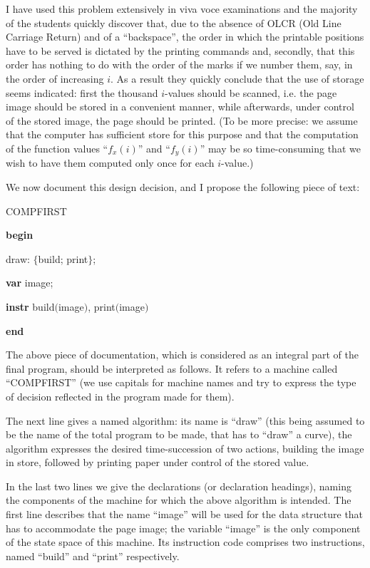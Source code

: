 \documentclass[twoside,11pt]{book}
\begin{document}
I have used this problem extensively in viva voce examinations and the majority of the students quickly discover that, due to the absence of OLCR (Old Line Carriage Return) and of a ``backspace'', the order in which the printable positions have to be served is dictated by the printing commands and, secondly, that this order has nothing to do with the order of the marks if we number them, say, in the order of increasing $i$. As a result they quickly conclude that the use of storage seems indicated: first the thousand $i$-values should be scanned, i.e. the page image should be stored in a convenient manner, while afterwards, under control of the stored image, the page should be printed. (To be more precise: we assume that the computer has sufficient store for this purpose and that the computation of the function values ``$f_x(i)$'' and ``$f_y(i)$'' may be so time-consuming that we wish to have them computed only once for each $i$-value.)

We now document this design decision, and I propose the following piece of text:

COMPFIRST

\textbf{begin}

\quad draw: $\{$build; print$\}$;

\quad\textbf{var} image;

\quad\textbf{instr} build$($image$)$, print$($image$)$

\textbf{end}

The above piece of documentation, which is considered as an integral part of the final program, should be interpreted as follows. It refers to a machine called ``COMPFIRST'' (we use capitals for machine names and try to express the type of decision reflected in the program made for them).

The next line gives a named algorithm: its name is ``draw'' (this being assumed to be the name of the total program to be made, that has to ``draw'' a curve), the algorithm expresses the desired time-succession of two actions, building the image in store, followed by printing paper under control of the stored value.

In the last two lines we give the declarations (or declaration headings), naming the components of the machine for which the above algorithm is intended. The first line describes that the name ``image'' will be used for the data structure that has to accommodate the page image; the variable ``image'' is the only component of the state space of this machine. Its instruction code comprises two instructions, named ``build'' and ``print'' respectively.
\end{document}

